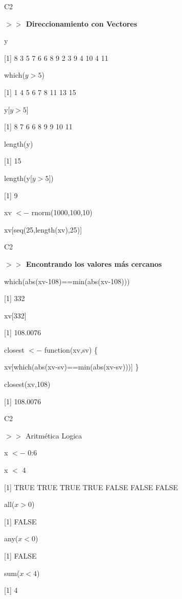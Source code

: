 \documentclass{beamer}
\theoremstyle{definition}
\theoremstyle{remark}
\begin{document}
\begin{frame}{C2}

\textbf{$>>$ Direccionamiento con Vectores}

\hfill

y

[1] 8 3 5 7 6 6 8 9 2 3 9 4 10 4 11

\hfill

which($y>5$)

[1] 1 4 5 6 7 8 11 13 15

\hfill

y[$y>5$]

[1] 8 7 6 6 8 9 9 10 11

\hfill

length(y)

[1] 15

\hfill

length(y[$y>5$])

[1] 9

\hfill

xv $<-$ rnorm(1000,100,10)

\hfill

xv[seq(25,length(xv),25)]


\end{frame}


\begin{frame}{C2}

\textbf{$>>$ Encontrando los valores m\'as cercanos}

\hfill

which(abs(xv-108)==min(abs(xv-108)))

[1] 332

\hfill

xv[332]

[1] 108.0076

\hfill

closest $<-$ function(xv,sv) \{

xv[which(abs(xv-sv)==min(abs(xv-sv)))] \}

\hfill

closest(xv,108)

[1] 108.0076



\end{frame}


\begin{frame}{C2}

$>>$ Aritm\'etica Logica

\hfill

x $<-$ 0:6

\hfill

x $<$ 4

[1] TRUE TRUE TRUE TRUE FALSE FALSE FALSE

\hfill

all($ x>0$)

[1] FALSE

\hfill

any($ x<0$)

[1] FALSE

\hfill

sum($x<4$)

[1] 4



\end{frame}
\end{document}
